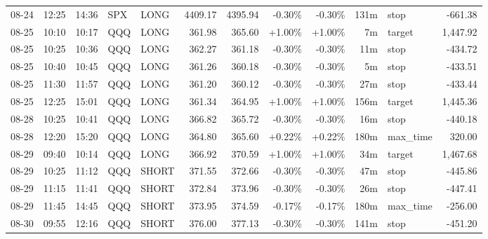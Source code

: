 \documentclass[11pt,a4paper,twoside]{article}
\begin{document}
\begin{center}
\begin{longtable}{>{\color{txtmain}}l l l l l r r r r r >{\color{txtmain}}l r}
08-24 & 12:25 & 14:36 & SPX & LONG & 4409.17 & 4395.94 & \textcolor{lossred}{-0.30\%} & \textcolor{lossred}{-0.30\%} & 131m & stop & \textcolor{lossred}{-661.38} \\
08-25 & 10:10 & 10:17 & QQQ & LONG & 361.98 & 365.60 & \textcolor{wingreen}{+1.00\%} & \textcolor{wingreen}{+1.00\%} & 7m & target & \textcolor{wingreen}{1,447.92} \\
08-25 & 10:25 & 10:36 & QQQ & LONG & 362.27 & 361.18 & \textcolor{lossred}{-0.30\%} & \textcolor{lossred}{-0.30\%} & 11m & stop & \textcolor{lossred}{-434.72} \\
08-25 & 10:40 & 10:45 & QQQ & LONG & 361.26 & 360.18 & \textcolor{lossred}{-0.30\%} & \textcolor{lossred}{-0.30\%} & 5m & stop & \textcolor{lossred}{-433.51} \\
08-25 & 11:30 & 11:57 & QQQ & LONG & 361.20 & 360.12 & \textcolor{lossred}{-0.30\%} & \textcolor{lossred}{-0.30\%} & 27m & stop & \textcolor{lossred}{-433.44} \\
08-25 & 12:25 & 15:01 & QQQ & LONG & 361.34 & 364.95 & \textcolor{wingreen}{+1.00\%} & \textcolor{wingreen}{+1.00\%} & 156m & target & \textcolor{wingreen}{1,445.36} \\
08-28 & 10:25 & 10:41 & QQQ & LONG & 366.82 & 365.72 & \textcolor{lossred}{-0.30\%} & \textcolor{lossred}{-0.30\%} & 16m & stop & \textcolor{lossred}{-440.18} \\
08-28 & 12:20 & 15:20 & QQQ & LONG & 364.80 & 365.60 & \textcolor{wingreen}{+0.22\%} & \textcolor{wingreen}{+0.22\%} & 180m & max\_time & \textcolor{wingreen}{320.00} \\
08-29 & 09:40 & 10:14 & QQQ & LONG & 366.92 & 370.59 & \textcolor{wingreen}{+1.00\%} & \textcolor{wingreen}{+1.00\%} & 34m & target & \textcolor{wingreen}{1,467.68} \\
08-29 & 10:25 & 11:12 & QQQ & SHORT & 371.55 & 372.66 & \textcolor{lossred}{-0.30\%} & \textcolor{lossred}{-0.30\%} & 47m & stop & \textcolor{lossred}{-445.86} \\
08-29 & 11:15 & 11:41 & QQQ & SHORT & 372.84 & 373.96 & \textcolor{lossred}{-0.30\%} & \textcolor{lossred}{-0.30\%} & 26m & stop & \textcolor{lossred}{-447.41} \\
08-29 & 11:45 & 14:45 & QQQ & SHORT & 373.95 & 374.59 & \textcolor{lossred}{-0.17\%} & \textcolor{lossred}{-0.17\%} & 180m & max\_time & \textcolor{lossred}{-256.00} \\
08-30 & 09:55 & 12:16 & QQQ & SHORT & 376.00 & 377.13 & \textcolor{lossred}{-0.30\%} & \textcolor{lossred}{-0.30\%} & 141m & stop & \textcolor{lossred}{-451.20} \\

\end{longtable}
\end{center}
\end{document}
